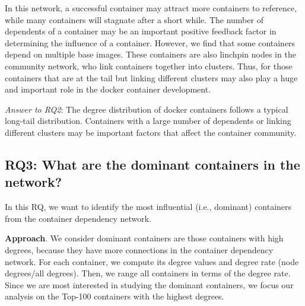 \documentclass[sigconf]{acmart}
\begin{document}
In this network, a successful container may attract more containers to reference, while many containers will stagnate after a short while. The number of dependents of a container may be an important positive feedback factor in determining the influence of a container. 
However, we find that some containers depend on multiple base images. 
These containers are also linchpin nodes in the community network, who link containers together into clusters. 
Thus, for those containers that are at the tail but linking different clusters %
may also play a huge and important role in the docker container development.





\begin{mybox}
\emph{Answer to RQ2}: 
The degree distribution of docker containers follows a typical long-tail distribution. 
Containers with a large number of dependents or linking different clusters may be important factors that affect the container community.
\end{mybox}




\subsection{RQ3: What are the dominant containers in the network?}
In this RQ, we want to identify the most influential (i.e., dominant) containers from the container dependency network. 

\noindent\textbf{Approach}. We consider dominant containers are those containers with high degrees, because they have more connections in the container dependency network. %
For each container, we compute its degree values and degree rate (node degrees/all degrees). Then, we 
range all containers in terms of the degree rate. 
Since we are most interested in studying the dominant containers, we focus our analysis on the Top-100 containers with the highest degrees. 
\end{document}

